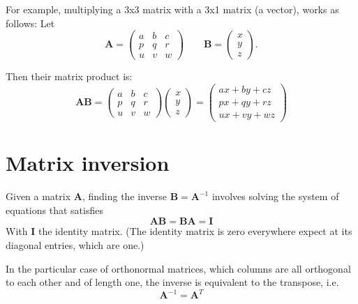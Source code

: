 \documentclass[paper=6.14in:9.21in,pagesize=pdftex,11pt,twoside,openright]{scrbook}
\begin{document}
For example, multiplying a 3x3 matrix with a 3x1 matrix (a vector), works as follows:
Let
\begin{equation}\nonumber
\mathbf{A} = \begin{pmatrix}
a & b & c \\
p & q & r \\
u & v & w
\end{pmatrix} \qquad \mathbf{B} = \begin{pmatrix}
x \\
y \\
z
\end{pmatrix}.
\end{equation}

Then their matrix product is:
\begin{equation}\nonumber
\mathbf{AB} = \begin{pmatrix}
a & b & c \\
p & q & r \\
u & v & w
\end{pmatrix} \begin{pmatrix}
x \\
y \\
z
\end{pmatrix} =\begin{pmatrix}
ax + by + cz \\
px + qy + rz \\
ux + vy + wz
\end{pmatrix}
\end{equation}

\section{Matrix inversion}
Given a matrix $\mathbf{A}$, finding the inverse $\mathbf{B}=\mathbf{A}^{-1}$ involves solving the system of equations that satisfies
\begin{equation}
\mathbf{AB}=\mathbf{BA}=\mathbf{I}
\end{equation}
With $\mathbf{I}$ the identity matrix. (The identity matrix is zero everywhere expect at its diagonal entries, which are one.)

In the particular case of orthonormal matrices, which columns are all orthogonal to each other and of length one, the inverse is equivalent to the transpose, i.e.
\begin{equation}
\mathbf{A}^{-1}=\mathbf{A}^T
\end{equation}
\end{document}
